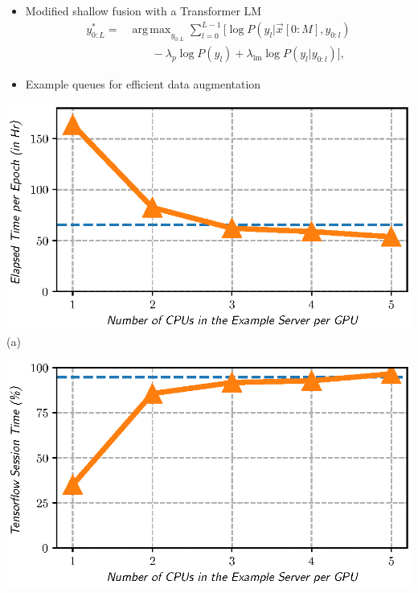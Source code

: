 \documentclass[a0,portrait]{a0poster}
\DeclareMathOperator*{\argmax}{arg\,max}
\newenvironment{Figure}
  {\par\medskip\noindent\minipage{\linewidth}}
  {\endminipage\par\medskip}
\begin{document}
\begin{multicols}{2}
\begin{minipage}[]{0.54\linewidth}
\begin{itemize}
      \item{Modified shallow fusion with a Transformer LM \cite{c_kim_interspeech_2019_00}}
        \begin{align}
  y_{0:L}^{*} = & \argmax_{y_{0:L}} \sum_{l=0}^{L-1} \Big[ \log P \left(y_l
  |\vec{x}[0:M], y_{0:l} \right)
  \nonumber \\
                           & \qquad - \lambda_p \log P(y_l)
                           + \lambda_{\text{lm}} \log P \left(y_l   |y_{0:l} \right)  \Big],
                           \label{eq:lm_fusion}
\end{align}
    \item{Example queues for efficient data augmentation}
    \end{itemize}
\end{minipage}
%
%
\begin{Figure}
  \captionsetup[subfigure]{justification=centering}
    \centering
    \begin{minipage}{0.49\linewidth}
			\centering
      {\includegraphics[width=175mm]{../figures/plot_example_server_time}  \label{fig:plot_example_server_time} }
			{(a)}	
    \end{minipage}
    \begin{minipage}{0.49\linewidth}
			\centering
      {\includegraphics[width=175mm]{../figures/plot_gpu_time_percentage} \label{fig:plot_gpu_time_percentage} }

\end{minipage}
\end{Figure}
\end{multicols}
\end{document}
